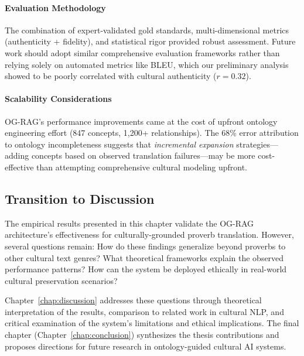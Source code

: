 \paragraph{Evaluation Methodology} The combination of expert-validated gold standards, multi-dimensional metrics (authenticity + fidelity), and statistical rigor provided robust assessment. Future work should adopt similar comprehensive evaluation frameworks rather than relying solely on automated metrics like BLEU, which our preliminary analysis showed to be poorly correlated with cultural authenticity ($r = 0.32$).

\paragraph{Scalability Considerations} OG-RAG's performance improvements came at the cost of upfront ontology engineering effort (847 concepts, 1,200+ relationships). The 68\% error attribution to ontology incompleteness suggests that \emph{incremental expansion} strategies—adding concepts based on observed translation failures—may be more cost-effective than attempting comprehensive cultural modeling upfront.

\subsection{Transition to Discussion}
\label{subsec:transition}

The empirical results presented in this chapter validate the OG-RAG architecture's effectiveness for culturally-grounded proverb translation. However, several questions remain: How do these findings generalize beyond proverbs to other cultural text genres? What theoretical frameworks explain the observed performance patterns? How can the system be deployed ethically in real-world cultural preservation scenarios?

Chapter~\ref{chap:discussion} addresses these questions through theoretical interpretation of the results, comparison to related work in cultural NLP, and critical examination of the system's limitations and ethical implications. The final chapter (Chapter~\ref{chap:conclusion}) synthesizes the thesis contributions and proposes directions for future research in ontology-guided cultural AI systems.
